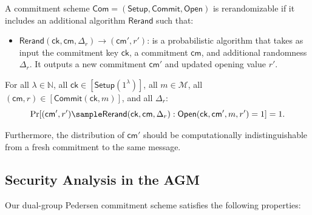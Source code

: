 \begin{definition}[Rerandomizability]
A commitment scheme $\mathsf{Com} = (\mathsf{Setup}, \mathsf{Commit}, \mathsf{Open})$ is rerandomizable if it includes an additional algorithm $\mathsf{Rerand}$ such that:

\begin{itemize}
\item $\mathsf{Rerand}(\mathsf{ck}, \mathsf{cm}, \Delta_r) \rightarrow (\mathsf{cm}', r')$: is a probabilistic algorithm that takes as input the commitment key $\mathsf{ck}$, a commitment $\mathsf{cm}$, and additional randomness $\Delta_r$. It outputs a new commitment $\mathsf{cm}'$ and updated opening value $r'$.
\end{itemize}

For all $\lambda \in \mathbb{N}$, all $\mathsf{ck} \in [\mathsf{Setup}(1^\lambda)]$, all $m \in \mathcal{M}$, all $(\mathsf{cm}, r) \in [\mathsf{Commit}(\mathsf{ck}, m)]$, and all $\Delta_r$:
$$\Pr[(\mathsf{cm}', r') \sample \mathsf{Rerand}(\mathsf{ck}, \mathsf{cm}, \Delta_r) : \mathsf{Open}(\mathsf{ck}, \mathsf{cm}', m, r') = 1] = 1.$$

Furthermore, the distribution of $\mathsf{cm}'$ should be computationally indistinguishable from a fresh commitment to the same message.
\end{definition}



\subsection{Security Analysis in the AGM}

Our dual-group Pedersen commitment scheme satisfies the following properties:

